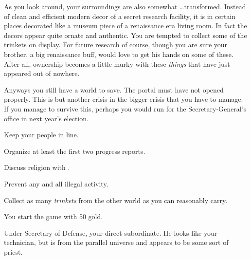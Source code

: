 \documentclass[char]{guildcamp3}
\begin{document}
As you look around, your surroundings are also somewhat \ldots transformed. Instead of clean and efficient modern decor of a secret research facility, it is in certain places decorated like a museum piece of a renaissance era living room. In fact the decors appear quite ornate and authentic. You are tempted to collect some of the trinkets on display. For future research of course, though you are sure your brother, a big renaissance buff, would love to get his hands on some of these. After all, ownership becomes a little murky with these \emph{things} that have just appeared out of nowhere.

Anyways you still have a world to save. The portal must have not opened properly. This is but another crisis in the bigger crisis that you have to manage. If you manage to survive this, perhaps you would run for the Secretary-General's office in next year's election.

\begin{itemz}[Goals]
  \item Keep your people in line.
  \item Organize at least the first two progress reports.
  \item Discuss religion with \cPaladin{}.
  \item Prevent any and all illegal activity.
  \item Collect as many \emph{trinkets} from the other world as you can reasonably carry.
\end{itemz}

\begin{itemz}[Notes]
	\item You start the game with 50 gold. 
	\end{itemz}
\begin{contacts}
  \contact{\cPoliTwo{}} Under Secretary of Defense, your direct subordinate.
  \contact{\cPaladin{}} He looks like your technician, but is from the parallel universe and appears to be some sort of priest.
\end{contacts}
\end{document}
